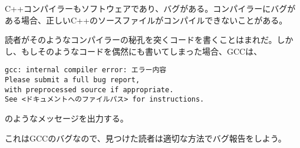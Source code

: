 
C++コンパイラーもソフトウェアであり、バグがある。コンパイラーにバグがある場合、正しいC++のソースファイルがコンパイルできないことがある。

読者がそのようなコンパイラーの秘孔を突くコードを書くことはまれだ。しかし、もしそのようなコードを偶然にも書いてしまった場合、GCCは、
\begin{lstlisting}[style=terminal]
gcc: internal compiler error: エラー内容
Please submit a full bug report,
with preprocessed source if appropriate.
See <ドキュメントへのファイルパス> for instructions.
\end{lstlisting}
のようなメッセージを出力する。

これはGCCのバグなので、見つけた読者は適切な方法でバグ報告をしよう。
